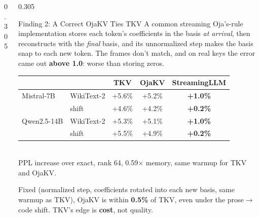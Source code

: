 \documentclass[final]{beamer}
\begin{document}
\begin{frame}[t]
\begin{columns}[t]
\begin{column}{0.305\paperwidth}
\end{column}

\begin{column}{0.305\paperwidth}

\begin{block}{Finding 2: A Correct OjaKV Ties TKV}
A common streaming Oja's-rule implementation stores each token's
coefficients in the basis \emph{at arrival}, then reconstructs with the
\emph{final} basis, and its unnormalized step makes the basis snap to each new
token. The frames don't match, and on real keys the error came out
\textbf{above 1.0}: worse than storing zeros.
\vspace{0.3cm}
\begin{center}
\begin{tabular}{llccc}
\toprule
 & & TKV & OjaKV & StreamingLLM \\
\midrule
Mistral-7B & WikiText-2 & +5.6\% & +5.2\% & \textbf{\color{teal}+1.0\%} \\
           & shift      & +4.6\% & +4.2\% & \textbf{\color{teal}+0.2\%} \\[0.15cm]
Qwen2.5-14B & WikiText-2 & +5.3\% & +5.1\% & \textbf{\color{teal}+1.0\%} \\
           & shift      & +5.5\% & +4.9\% & \textbf{\color{teal}+0.2\%} \\
\bottomrule
\end{tabular}\\[0.2cm]
{\footnotesize\color{muted} PPL increase over exact, rank 64, 0.59$\times$ memory, same warmup for TKV and OjaKV.}
\end{center}
\vspace{0.2cm}
Fixed (normalized step, coefficients rotated into each new basis, same warmup
as TKV), OjaKV is within \textbf{0.5\%} of TKV, even under the prose$\to$code
shift. TKV's edge is \textbf{cost}, not quality.
\end{block}


\end{column}
\end{columns}
\end{frame}
\end{document}
